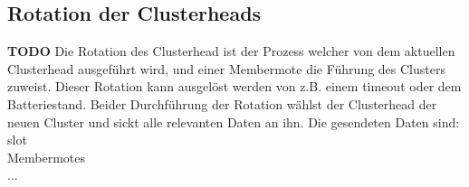 \subsection{Rotation der Clusterheads} \textbf{TODO}
Die Rotation des Clusterhead ist der Prozess welcher von dem aktuellen Clusterhead ausgef\"uhrt wird, und einer Membermote die F\"uhrung des Clusters zuweist.
Dieser Rotation kann ausgel\"ost werden von z.B. einem timeout oder dem Batteriestand.
Beider Durchf\"uhrung der Rotation w\"ahlst der Clusterhead der neuen Cluster und sickt alle relevanten Daten an ihn.
Die gesendeten Daten sind:
slot\\
Membermotes\\
...\\

